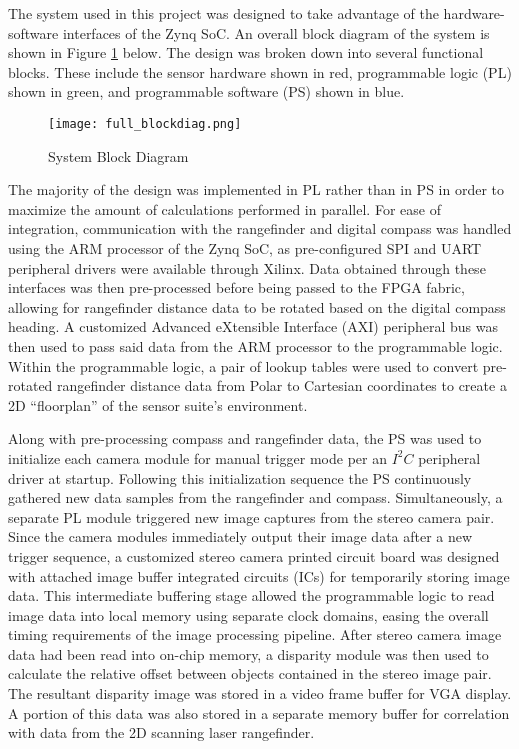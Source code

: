 The system used in this project was designed to take advantage of the hardware-software interfaces of the Zynq SoC. An overall block diagram of the system is shown in Figure \ref{systemBD} below. The design was broken down into several functional blocks. These include the sensor hardware shown in red, programmable logic (PL) shown in green, and programmable software (PS) shown in blue. 

\begin{figure}[H] 
	\centerline{
	\texttt{[image: full\_blockdiag.png]}
	}
	\caption{System Block Diagram}
	\label{systemBD}
\end{figure}

The majority of the design was implemented in PL rather than in PS in order to maximize the amount of calculations performed in parallel. For ease of integration, communication with the rangefinder and digital compass was handled using the ARM processor of the Zynq SoC, as  pre-configured SPI and UART peripheral drivers were available through Xilinx. Data obtained through these interfaces was then pre-processed before being passed to the FPGA fabric, allowing for rangefinder distance data to be rotated based on the digital compass heading. A customized Advanced eXtensible Interface (AXI) peripheral bus was then used to pass said data from the ARM processor to the programmable logic. Within the programmable logic, a pair of lookup tables were used to convert pre-rotated rangefinder distance data from Polar to Cartesian coordinates to create a 2D “floorplan” of the sensor suite’s environment.
\par
Along with pre-processing compass and rangefinder data, the PS was used to initialize each camera module for manual trigger mode per an $I^2C$ peripheral driver at startup. Following this initialization sequence the PS continuously gathered new data samples from the rangefinder and compass. Simultaneously, a separate PL module triggered new image captures from the stereo camera pair. Since the camera modules immediately output their image data after a new trigger sequence, a customized stereo camera printed circuit board was designed with attached image buffer integrated circuits (ICs) for temporarily storing image data. This intermediate buffering stage allowed the programmable logic to read image data into local memory using separate clock domains, easing the overall timing requirements of the image processing pipeline. After stereo camera image data had been read into on-chip memory, a disparity module was then used to calculate the relative offset between objects contained in the stereo image pair. The resultant disparity image was stored in a video frame buffer for VGA display. A portion of this data was also stored in a separate memory buffer for correlation with data from the 2D scanning laser rangefinder. 
